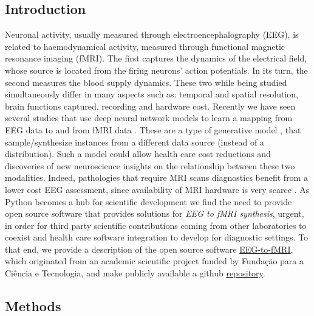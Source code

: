 \subsection{Introduction}\label{section:introduction}


Neuronal activity, usually measured through electroencephalography (EEG), is related to haemodynamical activity, measured through functional magnetic resonance imaging (fMRI). The first captures the dynamics of the electrical field, whose source is located from the firing neurons' action potentials. In its turn, the second measures the blood supply dynamics. These two while being studied simultaneously \cite{shibasaki2008human,yu2016building,he2018spatialtemporaldo,rojas2018study,brechet2019capturing,daly2019electroencephalography,cury2020sparse,abreu2021eeg} differ in many aspects such as: temporal and spatial resolution, brain functions captured, recording and hardware cost. Recently we have seen several studies that use deep neural network models \cite{goodfellow2016deep} to learn a mapping from EEG data to and from fMRI data \cite{liu2019convolutional, calhas2022eeg}. These are a type of generative model \cite{murphy2012machine}, that sample/synthesize instances from a different data source (instead of a distribution). Such a model could allow health care cost reductions and discoveries of new neuroscience insights on the relationship between these two modalities. Indeed, pathologies that require MRI scans diagnostics benefit from a lower cost EEG assessment, since availability of MRI hardware is very scarce \cite{ogbole2018survey}. As Python \cite{van1995python} becomes a hub for scientific development \cite{harris2020array,virtanen2020scipy,abadi2016tensorflow} we find the need to provide open source software that provides solutions for \textit{EEG to fMRI synthesis}, urgent, in order for third party scientific contributions coming from other laboratories to coexist and health care software integration to develop for diagnostic settings. To that end, we provide a description of the open source software \href{https://pypi.org/project/eeg-to-fmri/}{EEG-to-fMRI}, which originated from an academic scientific project funded by Funda\c{c}\~ao para a Ci\^encia e Tecnologia, and make publicly available a github \href{https://github.com/eeg-to-fmri/eeg-to-fmri}{repository}.

\subsection{Methods}\label{section:methods}

